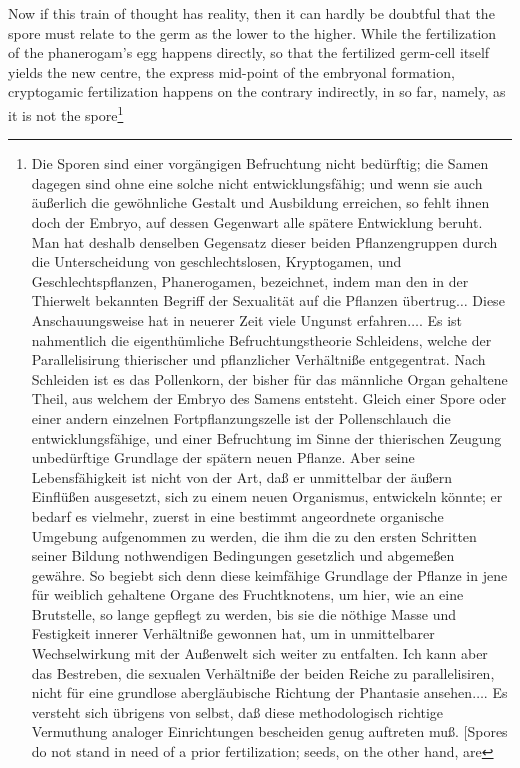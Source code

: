 \documentclass[12pt,a4paper]{book}
\begin{document}
Now if this train of thought has reality, then it can hardly be doubtful that the
spore must relate to the germ as the lower to the higher. While the fertilization
of the phanerogam's egg happens directly, so that the fertilized germ-cell itself
yields the new centre, the express mid-point of the embryonal formation,
cryptogamic fertilization happens on the contrary indirectly, in so far, namely,
as it is not the spore\footnote{Die Sporen sind einer vorgängigen Befruchtung
nicht bedürftig; die Samen dagegen sind ohne eine solche nicht entwicklungsfähig;
und wenn sie auch äußerlich die gewöhnliche Gestalt und Ausbildung erreichen, so
fehlt ihnen doch der Embryo, auf dessen Gegenwart alle spätere Entwicklung beruht.
Man hat deshalb denselben Gegensatz dieser beiden Pflanzengruppen durch die
Unterscheidung von geschlechtslosen, Kryptogamen, und Geschlechtspflanzen,
Phanerogamen, bezeichnet, indem man den in der Thierwelt bekannten Begriff der
Sexualität auf die Pflanzen übertrug$\ldots$ Diese Anschauungsweise hat in neuerer
Zeit viele Ungunst erfahren$\ldots$. Es ist nahmentlich die eigenthümliche
Befruchtungstheorie Schleidens, welche der Parallelisirung thierischer und
pflanzlicher Verhältniße entgegentrat. Nach Schleiden ist es das Pollenkorn, der
bisher für das männliche Organ gehaltene Theil, aus welchem der Embryo des Samens
entsteht. Gleich einer Spore oder einer andern einzelnen Fortpflanzungszelle ist
der Pollenschlauch die entwicklungsfähige, und einer Befruchtung im Sinne der
thierischen Zeugung unbedürftige Grundlage der spätern neuen Pflanze. Aber seine
Lebensfähigkeit ist nicht von der Art, daß er unmittelbar der äußern Einflüßen
ausgesetzt, sich zu einem neuen Organismus, entwickeln könnte; er bedarf es
vielmehr, zuerst in eine bestimmt angeordnete organische Umgebung aufgenommen zu
werden, die ihm die zu den ersten Schritten seiner Bildung nothwendigen
Bedingungen gesetzlich und abgemeßen gewähre. So begiebt sich denn diese
keimfähige Grundlage der Pflanze in jene für weiblich gehaltene Organe des
Fruchtknotens, um hier, wie an eine Brutstelle, so lange gepflegt zu werden, bis
sie die nöthige Masse und Festigkeit innerer Verhältniße gewonnen hat, um in
unmittelbarer Wechselwirkung mit der Außenwelt sich weiter zu entfalten. Ich kann
aber das Bestreben, die sexualen Verhältniße der beiden Reiche zu parallelisiren,
nicht für eine grundlose abergläubische Richtung der Phantasie
ansehen$\ldots$. Es versteht sich übrigens von selbst, daß diese methodologisch
richtige Vermuthung analoger Einrichtungen bescheiden genug auftreten muß. [Spores
do not stand in need of a prior fertilization; seeds, on the other hand, are
}
\end{document}

